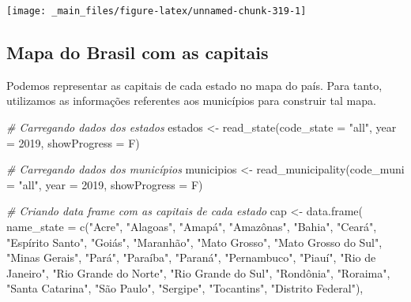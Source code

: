\documentclass[
  brazilian,
]{book}
\newenvironment{Shaded}{\begin{snugshade}}{\end{snugshade}}
\newcommand{\AttributeTok}[1]{\textcolor[rgb]{0.77,0.63,0.00}{#1}}
\newcommand{\CommentTok}[1]{\textcolor[rgb]{0.56,0.35,0.01}{\textit{#1}}}
\newcommand{\DecValTok}[1]{\textcolor[rgb]{0.00,0.00,0.81}{#1}}
\newcommand{\FunctionTok}[1]{\textcolor[rgb]{0.00,0.00,0.00}{#1}}
\newcommand{\NormalTok}[1]{#1}
\newcommand{\OtherTok}[1]{\textcolor[rgb]{0.56,0.35,0.01}{#1}}
\newcommand{\StringTok}[1]{\textcolor[rgb]{0.31,0.60,0.02}{#1}}
\begin{document}
\begin{center}\texttt{[image: \_main\_files/figure-latex/unnamed-chunk-319-1]} \end{center}

\hypertarget{mapa-do-brasil-com-as-capitais}{%
\subsection{Mapa do Brasil com as capitais}\label{mapa-do-brasil-com-as-capitais}}

Podemos representar as capitais de cada estado no mapa do país. Para tanto, utilizamos as informações referentes aos municípios para construir tal mapa.

\begin{Shaded}
\begin{Highlighting}[]
\CommentTok{\# Carregando dados dos estados}
\NormalTok{estados }\OtherTok{\textless{}{-}} \FunctionTok{read\_state}\NormalTok{(}\AttributeTok{code\_state =} \StringTok{"all"}\NormalTok{,}
                      \AttributeTok{year =} \DecValTok{2019}\NormalTok{,}
                      \AttributeTok{showProgress =}\NormalTok{ F)}

\CommentTok{\# Carregando dados dos municípios}
\NormalTok{municipios }\OtherTok{\textless{}{-}} \FunctionTok{read\_municipality}\NormalTok{(}\AttributeTok{code\_muni =} \StringTok{"all"}\NormalTok{,}
                                \AttributeTok{year =} \DecValTok{2019}\NormalTok{,}
                                \AttributeTok{showProgress =}\NormalTok{ F)}

\CommentTok{\# Criando data frame com as capitais de cada estado}
\NormalTok{cap }\OtherTok{\textless{}{-}} \FunctionTok{data.frame}\NormalTok{(}
  \AttributeTok{name\_state =} \FunctionTok{c}\NormalTok{(}\StringTok{"Acre"}\NormalTok{, }\StringTok{"Alagoas"}\NormalTok{, }\StringTok{"Amapá"}\NormalTok{, }\StringTok{"Amazônas"}\NormalTok{, }\StringTok{"Bahia"}\NormalTok{, }\StringTok{"Ceará"}\NormalTok{, }\StringTok{"Espírito Santo"}\NormalTok{, }\StringTok{"Goiás"}\NormalTok{, }\StringTok{"Maranhão"}\NormalTok{, }\StringTok{"Mato Grosso"}\NormalTok{, }\StringTok{"Mato Grosso do Sul"}\NormalTok{, }\StringTok{"Minas Gerais"}\NormalTok{, }\StringTok{"Pará"}\NormalTok{, }\StringTok{"Paraíba"}\NormalTok{, }\StringTok{"Paraná"}\NormalTok{, }\StringTok{"Pernambuco"}\NormalTok{, }\StringTok{"Piauí"}\NormalTok{, }\StringTok{"Rio de Janeiro"}\NormalTok{, }\StringTok{"Rio Grande do Norte"}\NormalTok{, }\StringTok{"Rio Grande do Sul"}\NormalTok{, }\StringTok{"Rondônia"}\NormalTok{, }\StringTok{"Roraima"}\NormalTok{, }\StringTok{"Santa Catarina"}\NormalTok{, }\StringTok{"São Paulo"}\NormalTok{, }\StringTok{"Sergipe"}\NormalTok{, }\StringTok{"Tocantins"}\NormalTok{, }\StringTok{"Distrito Federal"}\NormalTok{),}
  

\end{Highlighting}
\end{Shaded}
\end{document}
